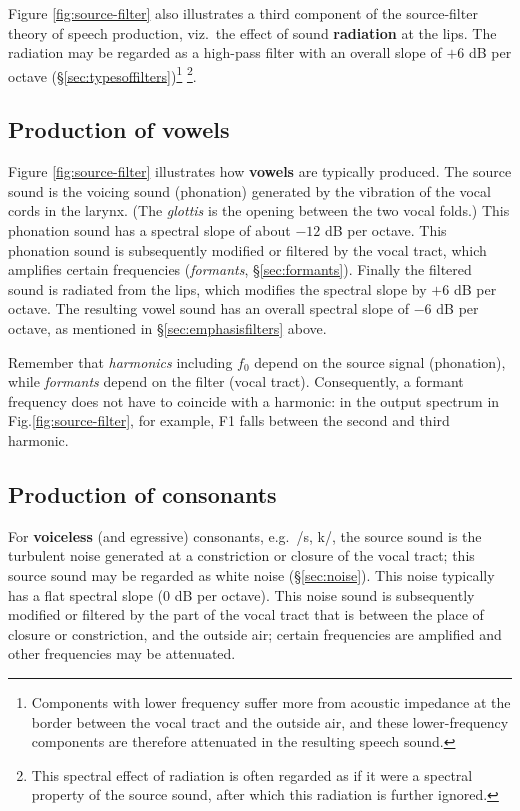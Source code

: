 \documentclass[
]{book}
\begin{document}
Figure \ref{fig:source-filter} also illustrates a third component of the source-filter theory of speech production, viz.~the effect of sound \textbf{radiation} at the lips. The radiation may be regarded as a high-pass filter with an overall slope of \(+6\) dB per octave (§\ref{sec:typesoffilters})\footnote{Components with lower frequency suffer more from acoustic impedance at the border between the vocal tract and the outside air, and these lower-frequency components are therefore attenuated in the resulting speech sound.} \footnote{This spectral effect of radiation is often regarded as if it were a spectral property of the source sound, after which this radiation is further ignored.}.

\subsection{Production of vowels}\label{sec:vowelproduction}

Figure \ref{fig:source-filter} illustrates how \textbf{vowels} are typically produced. The source sound is the voicing sound (phonation) generated by the vibration of the vocal cords in the larynx. (The \emph{glottis} is the opening between the two vocal folds.) This phonation sound has a spectral slope of about \(-12\) dB per octave. This phonation sound is subsequently modified or filtered by the vocal tract, which amplifies certain frequencies (\emph{formants}, §\ref{sec:formants}). Finally the filtered sound is radiated from the lips, which modifies the spectral slope by \(+6\) dB per octave. The resulting vowel sound has an overall spectral slope of \(-6\) dB per octave, as mentioned in §\ref{sec:emphasisfilters} above.

Remember that \emph{harmonics} including \(f_0\) depend on the source signal (phonation), while \emph{formants} depend on the filter (vocal tract). Consequently, a formant frequency does not have to coincide with a harmonic: in the output spectrum in Fig.\ref{fig:source-filter}, for example, F1 falls between the second and third harmonic.

\subsection{Production of consonants}\label{production-of-consonants}

For \textbf{voiceless} (and egressive) consonants, e.g.~/s, k/, the source sound is the turbulent noise generated at a constriction or closure of the vocal tract; this source sound may be regarded as white noise (§\ref{sec:noise}). This noise typically has a flat spectral slope (\(0\) dB per octave). This noise sound is subsequently modified or filtered by the part of the vocal tract that is between the place of closure or constriction, and the outside air; certain frequencies are amplified and other frequencies may be attenuated.\\
\end{document}
